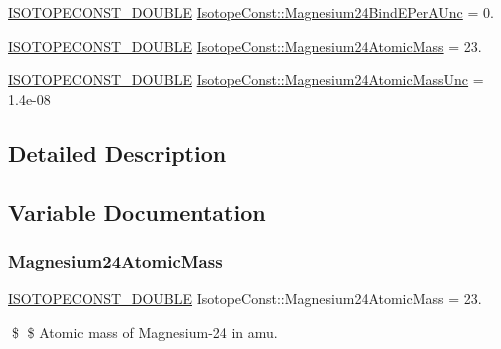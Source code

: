 \begin{DoxyCompactItemize}
\mbox{\hyperlink{group___isotope_const-_macros_ga8f45a7272ce02c0b4c65c44636ed719a}{I\+S\+O\+T\+O\+P\+E\+C\+O\+N\+S\+T\+\_\+\+D\+O\+U\+B\+LE}} \mbox{\hyperlink{group___isotope_const-_magnesium-_mg24_gae2baf9e71dfac60b30c687ca775d7059}{Isotope\+Const\+::\+Magnesium24\+Bind\+E\+Per\+A\+Unc}} = 0.
\item 
\mbox{\hyperlink{group___isotope_const-_macros_ga8f45a7272ce02c0b4c65c44636ed719a}{I\+S\+O\+T\+O\+P\+E\+C\+O\+N\+S\+T\+\_\+\+D\+O\+U\+B\+LE}} \mbox{\hyperlink{group___isotope_const-_magnesium-_mg24_gaf6c130d8b5fddd0776e10fcd44195ae8}{Isotope\+Const\+::\+Magnesium24\+Atomic\+Mass}} = 23.
\item 
\mbox{\hyperlink{group___isotope_const-_macros_ga8f45a7272ce02c0b4c65c44636ed719a}{I\+S\+O\+T\+O\+P\+E\+C\+O\+N\+S\+T\+\_\+\+D\+O\+U\+B\+LE}} \mbox{\hyperlink{group___isotope_const-_magnesium-_mg24_ga397ea13487d76b2e60bef790f25388d6}{Isotope\+Const\+::\+Magnesium24\+Atomic\+Mass\+Unc}} = 1.\+4e-\/08
\end{DoxyCompactItemize}


\subsection{Detailed Description}


\subsection{Variable Documentation}
\mbox{\label{group___isotope_const-_magnesium-_mg24_gaf6c130d8b5fddd0776e10fcd44195ae8}} 
\subsubsection{\texorpdfstring{Magnesium24\+Atomic\+Mass}{Magnesium24AtomicMass}}
{\footnotesize\ttfamily \mbox{\hyperlink{group___isotope_const-_macros_ga8f45a7272ce02c0b4c65c44636ed719a}{I\+S\+O\+T\+O\+P\+E\+C\+O\+N\+S\+T\+\_\+\+D\+O\+U\+B\+LE}} Isotope\+Const\+::\+Magnesium24\+Atomic\+Mass = 23.}

\$ \$ Atomic mass of Magnesium-\/24 in amu. \mbox{\label{group___isotope_const-_magnesium-_mg24_ga397ea13487d76b2e60bef790f25388d6}} 

